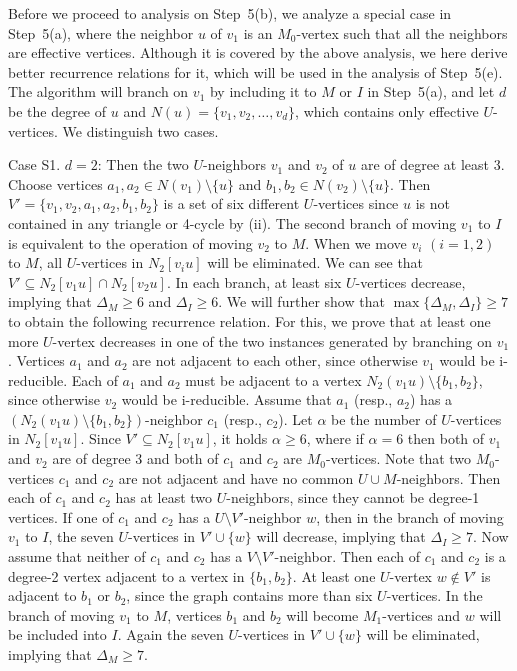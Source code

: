 \documentclass{elsart_TR2}
\begin{document}
Before we proceed to analysis on Step~5(b),
we analyze a special case in Step~5(a), where the neighbor $u$ of $v_1$
 is an $M_0$-vertex such that all the neighbors are effective vertices.
Although it is covered by the above analysis, we here derive better
recurrence relations for it, which will be used in the analysis of Step~5(e).
The algorithm will branch on $v_1$ by including it to $M$ or $I$ in Step~5(a),
and let $d$ be the degree of $u$ and $N(u)=\{v_1,v_2,\ldots,v_d\}$, which contains only effective $U$-vertices.
We distinguish two cases.

Case S1. $d=2$:
 Then the two $U$-neighbors $v_1$ and $v_2$ of $u$ are  of degree at least 3.
Choose vertices $ a_1,a_2\in N(v_1)\setminus\{u\}$ and $ b_1,b_2\in N(v_2)\setminus\{u\}$.
Then $V'=\{v_1,v_2,a_1,a_2,b_1,b_2\}$ is a set of six different $U$-vertices since $u$ is not contained in any triangle or 4-cycle by (ii).
The second branch of moving $v_1$ to $I$ is equivalent to the operation of moving $v_2$ to $M$.
When we move $v_i$ $(i=1,2)$ to $M$, all $U$-vertices in $N_2[v_iu]$ will be eliminated.
We can see that $V'\subseteq N_2[v_1u]\cap N_2[v_2u]$. In each branch, at least six $U$-vertices decrease,
implying that $\Delta_M\geq 6$ and $\Delta_I\geq 6$.
We will further show that $\max\{\Delta_M,\Delta_I\}\geq 7$
to obtain  the following   recurrence relation.
For this, we prove that
at least one more $U$-vertex decreases in one of the two instances generated by branching on $v_1$.
Vertices $a_1$ and $a_2$ are not adjacent to each other, since otherwise $v_1$ would be i-reducible.
Each of $a_1$ and $a_2$ must be adjacent to a vertex $N_2(v_1u)\setminus\{b_1,b_2\}$, since otherwise
$v_2$ would be i-reducible.
Assume that $a_1$ (resp., $a_2$)  has a  $(N_2(v_1u)\setminus\{b_1,b_2\})$-neighbor $c_1$ (resp.,  $c_2$).
Let $\alpha$ be the number of $U$-vertices in  $N_2[v_1u]$.
Since   $V'\subseteq N_2[v_1u]$, it holds $\alpha\geq 6$,
where if $\alpha=6$ then both of $v_1$ and $v_2$ are of degree 3
and both of $c_1$ and $c_2$ are $M_0$-vertices.
Note that two $M_0$-vertices $c_1$ and $c_2$ are not adjacent and have no common $U\cup M$-neighbors.
Then each of $c_1$ and $c_2$ has at least two $U$-neighbors, since they cannot be degree-1 vertices.
If one of $c_1$ and $c_2$  has a $U\setminus V'$-neighbor $w$, then in the branch of moving $v_1$ to $I$,
the seven $U$-vertices in $V'\cup \{w\}$ will decrease, implying that $\Delta_I \geq 7$.
Now assume that  neither of $c_1$ and $c_2$ has a $V\setminus V'$-neighbor.
Then
each of $c_1$ and $c_2$ is a degree-2 vertex adjacent to a vertex in $\{b_1,b_2\}$.
At least one $U$-vertex $w\not\in V'$ is adjacent to $b_1$ or $b_2$,
since the graph contains more than six $U$-vertices.
In the branch of moving $v_1$ to $M$, vertices $b_1$ and $b_2$ will become $M_1$-vertices
and $w$ will be included into $I$.
Again
the seven $U$-vertices in $V'\cup \{w\}$ will be eliminated, implying that $\Delta_M \geq 7$.
\end{document}
